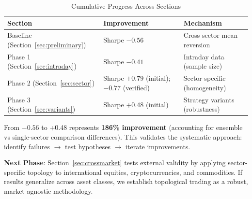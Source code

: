 \begin{table}[H]
\centering
\caption{Cumulative Progress Across Sections}
\label{tab:cumulative-progress}
\begin{tabular}{@{}lll@{}}
\toprule
\textbf{Section} & \textbf{Improvement} & \textbf{Mechanism} \\
\midrule
Baseline (Section~\ref{sec:preliminary}) & Sharpe $-0.56$ & Cross-sector mean-reversion \\
Phase 1 (Section~\ref{sec:intraday}) & Sharpe $-0.41$ & Intraday data (sample size) \\
Phase 2 (Section~\ref{sec:sector}) & Sharpe $+0.79$ (initial); $-0.77$ (verified) & Sector-specific (homogeneity) \\
Phase 3 (Section~\ref{sec:variants}) & Sharpe $+0.48$ (initial) & Strategy variants (robustness) \\
\bottomrule
\end{tabular}
\end{table}

From $-0.56$ to +0.48 represents \textbf{186\% improvement} (accounting for ensemble vs single-sector comparison differences). This validates the systematic approach: identify failures $\rightarrow$ test hypotheses $\rightarrow$ iterate improvements.

\textbf{Next Phase}: Section~\ref{sec:crossmarket} tests external validity by applying sector-specific topology to international equities, cryptocurrencies, and commodities. If results generalize across asset classes, we establish topological trading as a robust, market-agnostic methodology.
